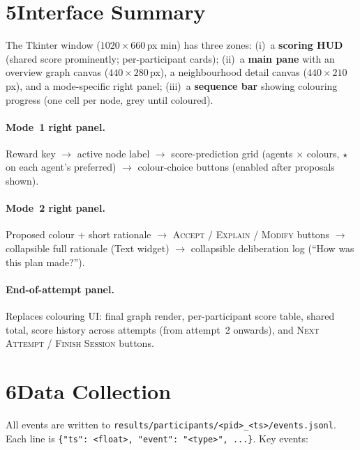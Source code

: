 \documentclass[9pt,twocolumn]{article}
\begin{document}
\section*{5\quad Interface Summary}

The Tkinter window ($1020\times660$\,px min) has three zones:
(i)~a \textbf{scoring HUD} (shared score prominently; per-participant cards);
(ii)~a \textbf{main pane} with an overview graph canvas ($440\times280$\,px), a
neighbourhood detail canvas ($440\times210$\,px), and a mode-specific right panel;
(iii)~a \textbf{sequence bar} showing colouring progress (one cell per node,
grey until coloured).

\paragraph{Mode~1 right panel.}
Reward key $\to$ active node label $\to$ score-prediction grid (agents $\times$ colours,
$\star$ on each agent's preferred) $\to$ colour-choice buttons (enabled after proposals shown).

\paragraph{Mode~2 right panel.}
Proposed colour + short rationale $\to$ \textsc{Accept} / \textsc{Explain} /
\textsc{Modify} buttons $\to$ collapsible full rationale (Text widget) $\to$ collapsible
deliberation log (``How was this plan made?'').

\paragraph{End-of-attempt panel.}
Replaces colouring UI: final graph render, per-participant score table, shared total,
score history across attempts (from attempt~2 onwards), and
\textsc{Next Attempt} / \textsc{Finish Session} buttons.

\section*{6\quad Data Collection}

All events are written to \texttt{results/participants/<pid>\_<ts>/events.jsonl}.
Each line is \texttt{\{"ts": <float>, "event": "<type>", ...\}}.  Key events:
\end{document}
